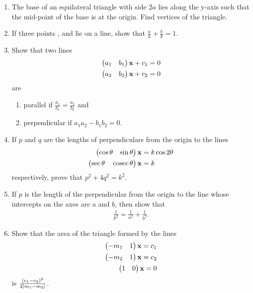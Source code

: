 \documentclass[journal,12pt,twocolumn]{IEEEtran}
\renewcommand\thesection{\arabic{section}}
\begin{document}
\begin{enumerate}[label=\thesection.\arabic*.,ref=\thesection.\theenumi]
\item The base of an equilateral triangle with side $2a$ lies along the y-axis such that the mid-point of the base is at the origin. Find vertices of the triangle.
\item If three points ,  and  lie on a line, show that
$\frac{a}{h}+\frac{b}{k}= 1$.
\item Show that two lines 
\begin{align}
\begin{pmatrix}a_1 & b_1\end{pmatrix}\mathbf{x} +c_1&= 0
\\
\begin{pmatrix}a_2 & b_2\end{pmatrix}\mathbf{x} +c_2&= 0
\end{align}
are 
\begin{enumerate}
\item parallel if $\frac{a_1}{b_1}=\frac{a_2}{b_2}$ and
\item perpendicular if $a_1a_2-b_1b_2 = 0$.
\end{enumerate}
%
\item If $p$ and $q$ are the lengths of perpendiculars from the origin to the lines 
%
\begin{align}
\begin{pmatrix}\cos\theta & \sin\theta\end{pmatrix}\mathbf{x} &= k\cos2\theta
\\
\begin{pmatrix}\sec\theta & \,\text{cosec}\,\theta\end{pmatrix}\mathbf{x} &= k
\end{align}
%
respectively, prove that $p^2+4q^2=k^2$.
\item If $p$ is the length of the perpendicular from the origin to the line whose intercepts on the axes are $a$ and $b$, then show that 
%
\begin{align}
\frac{1}{p^2} = \frac{1}{a^2}+\frac{1}{b^2}.
\end{align}
%
\item Show that the area of the triangle formed by the lines
%
\begin{align}
\begin{pmatrix}-m_1 & 1\end{pmatrix}\mathbf{x} = c_1
\\
\begin{pmatrix}-m_2 & 1\end{pmatrix}\mathbf{x} = c_2
\\
\begin{pmatrix}1 & 0\end{pmatrix}\mathbf{x} = 0
\end{align}
%
is $\frac{\left(c_1-c_2\right)^2}{2\left\vert m_1-m_2\right\vert}$.


\end{enumerate}
\end{document}
